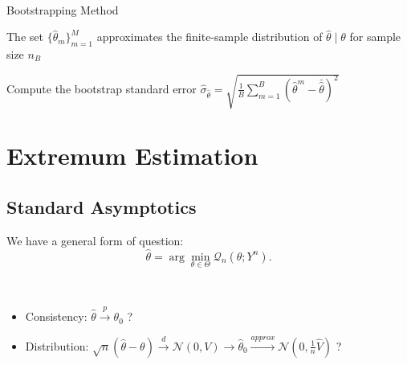 \begin{note}
    \

    \begin{algorithm}[H]
        \caption{Bootstrapping Method}
        \SetAlgoLined
        
        
        
        The set $\{\hat{\theta}_m\}_{m=1}^M$ approximates the finite-sample distribution of $\hat{\theta} \mid \theta$ for sample size $n_{B} $\;

        Compute the bootstrap standard error $\hat{\sigma}_{\hat{\theta}} = \sqrt{\frac{1}{B} \sum_{m=1}^{B} \left(\hat{\theta}^{m} - \bar{\hat{\theta}}\right)^2}$\;
    \end{algorithm}
\end{note}

\section{Extremum Estimation}

\subsection{Standard Asymptotics}

We have a general form of question:
\[
\hat{\theta} = \arg \min_{\theta \in \Theta} \mathcal{Q}_n(\theta; Y^n).
\]

\begin{problem*}
    \

    \begin{itemize}
        \item Consistency: $\hat{\theta} \overset{p}{\rightarrow} \theta_0$ ?
        \item Distribution: $\sqrt{n}(\hat{\theta} - \theta) \overset{d}{\rightarrow} \mathcal{N}(0, V) \rightarrow \hat{\theta}_0 \overset{approx}{\rightarrow} \mathcal{N}\left(0, \frac{1}{n} \hat{V}\right)$ ?
    \end{itemize}
\end{problem*}

